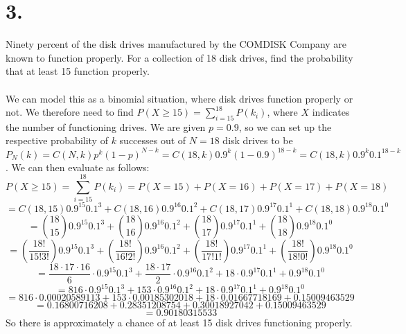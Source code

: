 \documentclass{article}
\begin{document}
{\section*{3.}
Ninety percent of the disk drives manufactured by the COMDISK Company are known to function properly. For a collection of 18 disk drives, find the probability that at least 15 function properly. 
\\
\\
We can model this as a binomial situation, where disk drives function properly or not. We therefore need to find \( P(X \geq 15) = \sum_{i=15}^{18} P(k_i) \), where \(X\) indicates the number of functioning drives. We are given \(p = 0.9\), so we can set up the respective probability of \(k\) successes out of \(N=18\) disk drives to be \( P_N(k) = C(N,k)p^k{(1-p)}^{N-k} = C(18,k)0.9^k{(1-0.9)}^{18-k} = C(18,k)0.9^k0.1^{18-k} \). We can then evaluate as follows:
\[
P(X \geq 15) = \sum_{i=15}^{18} P(k_i) = P(X=15) + P(X=16) + P(X=17) + P(X=18)
\]
\[
= C(18,15)0.9^{15}0.1^{3} + C(18,16)0.9^{16}0.1^{2} + C(18,17)0.9^{17}0.1^{1} + C(18,18)0.9^{18}0.1^{0}
\]
\[
= \binom{18}{15}0.9^{15}0.1^{3} + \binom{18}{16}0.9^{16}0.1^{2} + \binom{18}{17}0.9^{17}0.1^{1} + \binom{18}{18}0.9^{18}0.1^{0}
\]
\[
= (\frac{18!}{15!3!})0.9^{15}0.1^{3} + (\frac{18!}{16!2!})0.9^{16}0.1^{2} + (\frac{18!}{17!1!})0.9^{17}0.1^{1} + (\frac{18!}{18!0!})0.9^{18}0.1^{0}
\]
\[
= \frac{18 \cdot 17 \cdot 16}{6} \cdot 0.9^{15}0.1^{3} + \frac{18 \cdot 17}{2} \cdot 0.9^{16}0.1^{2} + 18 \cdot 0.9^{17}0.1^{1} + 0.9^{18}0.1^{0}
\]
\[
= 816 \cdot 0.9^{15}0.1^{3} + 153 \cdot 0.9^{16}0.1^{2} + 18 \cdot 0.9^{17}0.1^{1} + 0.9^{18}0.1^{0}
\]
\[
= 816 \cdot 0.00020589113 + 153 \cdot 0.00185302018 + 18 \cdot 0.01667718169 + 0.15009463529 
\]
\[
= 0.16800716208 + 0.28351208754 + 0.30018927042 + 0.15009463529
\]
\[
= 0.90180315533
\]
So there is approximately a  chance of at least 15 disk drives functioning properly. 

}
\end{document}
